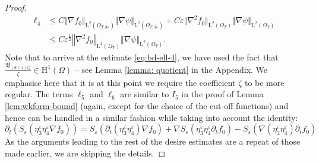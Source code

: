 \documentclass[10pt,a4paper]{amsart}
\newcommand{\eps}{\varepsilon}
\begin{document}
\begin{proof}
\begin{equation}\label{eq:bd-ell-4}
\begin{aligned}
\ell_4 & \leq C  \Vert \nabla f_0 \Vert_{\mathrm L^2(\Omega_{T,3\eps})} \Vert \nabla \psi \Vert_{\mathrm L^2(\Omega_{T,3\eps})} 
+ C \eps \Vert \nabla^2 f_0 \Vert_{\mathrm L^2(\Omega_T)} \Vert \nabla \psi \Vert_{\mathrm L^2(\Omega_T)}
\\
& \le C \eps^\frac12 \left\Vert \nabla^2 f_0 \right\Vert_{\mathrm L^2(\Omega_T)} \Vert \nabla \psi \Vert_{\mathrm L^2(\Omega_T)}.
\end{aligned}
\end{equation}
Note that to arrive at the estimate \eqref{eq:bd-ell-4}, we have used the fact that $\frac{\mathfrak{B}_{(d+1)ij}}{\zeta}\in \mathrm H^1(\Omega)$ -- see Lemma \ref{lemma: quotient} in the Appendix. We emphasise here that it is at this point we require the coefficient $\zeta$ to be more regular. The terms $\ell_5$ and $\ell_6$ are similar to $I_5$ in the proof of Lemma \ref{lem:wkform-bound} (again, except for the choice of the cut-off functions) and hence can be handled in a similar fashion while taking into account the identity:
\begin{equation*}
\partial_t \left( S_\eps\left(\eta^\eps_3 \eta^\eps_4 \nabla f_0\right) \right) 
= S_{\eps}(\partial_t(\eta^\eps_3 \eta^\eps_4) \nabla f_0) 
+ \nabla S_{\eps}\left(\eta^\eps_3 \eta^\eps_4\partial_t f_0\right) - S_\eps\left(\nabla \left(\eta^\eps_3 \eta^\eps_4\right) \partial_t f_0\right)
\end{equation*}
As the arguments leading to the rest of the  desire estimates are a repeat of those made earlier, we are skipping the details.
\end{proof}
\end{document}
